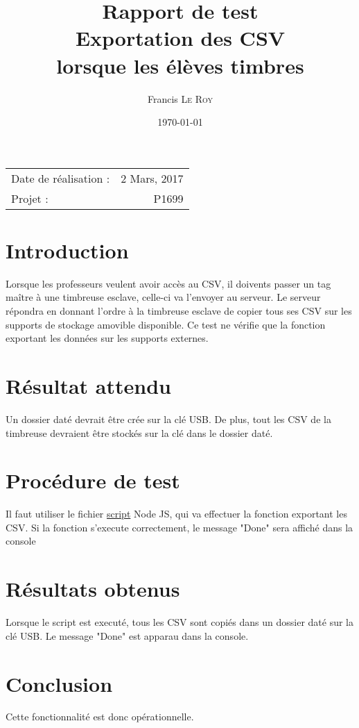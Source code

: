 \documentclass[10pt,a4paper,onecolumn]{article}
\title{Rapport de test \\ Exportation des CSV \\ lorsque les élèves timbres}
\author{Francis \textsc{Le Roy}}
\date{\today}
\begin{document}
\maketitle
\thispagestyle{fancy}

\begin{center}
\begin{tabular}{l r}
Date de réalisation : & 2 Mars, 2017 \\
Projet : & P1699 \\
\end{tabular}
\end{center}

\section{Introduction}
Lorsque les professeurs veulent avoir accès au CSV, il doivents passer un tag maître à une timbreuse esclave, celle-ci va l'envoyer au serveur. Le serveur répondra en donnant l'ordre à la timbreuse esclave de copier tous ses CSV sur les supports de stockage amovible disponible. Ce test ne vérifie que la fonction exportant les données sur les supports externes.
\section{Résultat attendu}
Un dossier daté devrait être crée sur la clé USB. De plus, tout les CSV de la timbreuse devraient être stockés sur la clé dans le dossier daté.
\section{Procédure de test}
Il faut utiliser le fichier \href{run:../../../test/csv_export.js}{script} Node JS, qui va effectuer la fonction exportant les CSV. Si la fonction s'execute correctement, le message "Done" sera affiché dans la console
\section{Résultats obtenus}
Lorsque le script est executé, tous les CSV sont copiés dans un dossier daté sur la clé USB. Le message "Done" est apparau dans la console.
\section{Conclusion}
Cette fonctionnalité est donc opérationnelle.
\end{document}
